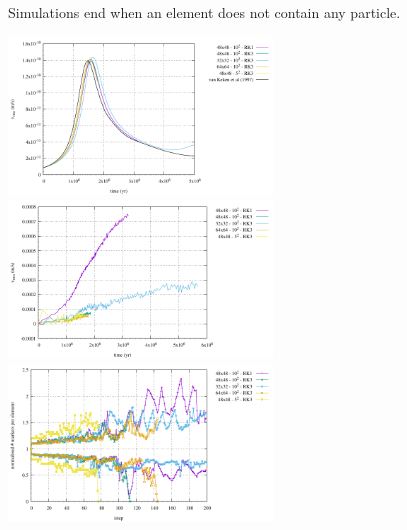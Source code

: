 Simulations end when an element does not contain any particle.
\begin{center}
\includegraphics[width=7cm]{python_codes/fieldstone_41/results/vrms.pdf}
\includegraphics[width=7cm]{python_codes/fieldstone_41/results/mass.pdf}\\
\includegraphics[width=7cm]{python_codes/fieldstone_41/results/nmarker.pdf}
\end{center}

